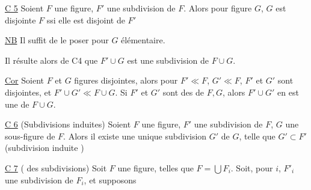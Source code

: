 
 


\uline{C 5} Soient $F$ une figure, $F'$ une subdivision de $F$. Alors pour  figure $G$, $G$ est disjointe  $F$ ssi elle est disjoint de $F'$

\uline{NB} Il suffit de le poser pour $G$ élémentaire.

Il résulte alors de  C4 que $F'\cup G$ est une subdivision de $F\cup G$.

\uline{Cor} Soient $F$ et $G$ figures disjointes, alors pour $F'\ll F$, $G'\ll F$, $F'$ et $G'$ sont disjointes, et $F'\cup G'\ll F\cup G$. Si $F'$ et $G'$ sont des  de $F,G$, alors $F'\cup G'$ en est une de $F\cup G$.

\uline{C 6} (Subdivisions induites) Soient $F$ une figure, $F'$ une subdivision de $F$, $G$ une sous-figure de $F$. Alors il existe une unique subdivision $G'$ de $G$, telle que $G'\subset F'$ (subdivision induite )


\uline{C 7} ( des subdivisions) Soit $F$ une figure,    telles que $F=\bigcup F_i$. Soit, pour  $i$, $F'_i$ une subdivision de $F_i$, et supposons
